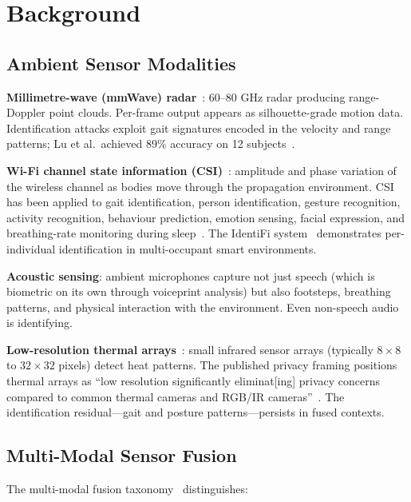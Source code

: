 \documentclass[sigconf,nonacm]{acmart}
\begin{document}
\section{Background}

\subsection{Ambient Sensor Modalities}

\textbf{Millimetre-wave (mmWave) radar}~\cite{lu2019mid}: 60--80
GHz radar producing range-Doppler point clouds. Per-frame
output appears as silhouette-grade motion data. Identification
attacks exploit gait signatures encoded in the velocity and
range patterns; Lu et al.\ achieved 89\% accuracy on 12
subjects~\cite{lu2019mid}.

\textbf{Wi-Fi channel state information (CSI)}~\cite{hori2024merl,
rizk2025identifi,armas2025ehunam}: amplitude and phase variation
of the wireless channel as bodies move through the propagation
environment. CSI has been applied to gait identification,
person identification, gesture recognition, activity
recognition, behaviour prediction, emotion sensing, facial
expression, and breathing-rate monitoring during
sleep~\cite{hori2024merl}. The IdentiFi
system~\cite{rizk2025identifi} demonstrates per-individual
identification in multi-occupant smart environments.

\textbf{Acoustic sensing}: ambient microphones capture not just
speech (which is biometric on its own through voiceprint
analysis) but also footsteps, breathing patterns, and physical
interaction with the environment. Even non-speech audio is
identifying.

\textbf{Low-resolution thermal arrays}~\cite{xie2024tadar}: small
infrared sensor arrays (typically $8 \times 8$ to $32 \times 32$
pixels) detect heat patterns. The published privacy framing
positions thermal arrays as ``low resolution significantly
eliminat[ing] privacy concerns compared to common thermal
cameras and RGB/IR cameras''~\cite{xie2024tadar}. The
identification residual---gait and posture
patterns---persists in fused contexts.

\subsection{Multi-Modal Sensor Fusion}

The multi-modal fusion taxonomy~\cite{ramachandram2017multimodal,
liu2024multimodalsurv,george2025tinyml} distinguishes:
\end{document}
